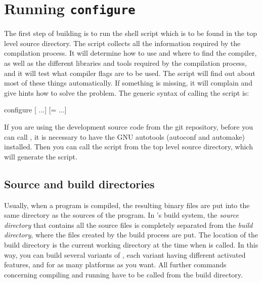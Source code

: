 \section{Running \texttt{configure}}
\label{sec:configure}


The first step of building \es is to run the shell script
 which is to be found in the top level source
directory.  The script collects all the information required by the
compilation process.  It will determine how to use and where to find
the compiler, as well as the different libraries and tools required by
the compilation process, and it will test what compiler flags are to
be used.  The script will find out about most of these things
automatically.  If something is missing, it will complain and give
hints how to solve the problem.  The generic syntax of calling the
 script is:
\begin{code}
configure [ ...] [= ...]
\end{code}

If you are using the development source code from the \textsf{git}
repository, before you can call , it is necessary
to have the GNU autotools (\textsf{autoconf} and \textsf{automake})
installed. Then you can call the script  from the
top level source directory, which will generate the
 script.

\subsection{Source and build directories}
\label{ssec:builddir}
 

Usually, when a program is compiled, the resulting binary files are
put into the same directory as the sources of the program.  In \es's
build system, the \emph{source directory} that contains all the source
files is completely separated from the \emph{build directory}, where
the files created by the build process are put.  The location of the
build directory is the current working directory at the time when
 is called.  In this way, you can build several
variants of \es, each variant having different activated features, and
for as many platforms as you want.  All further commands concerning
compiling and running \es have to be called from the build directory.

